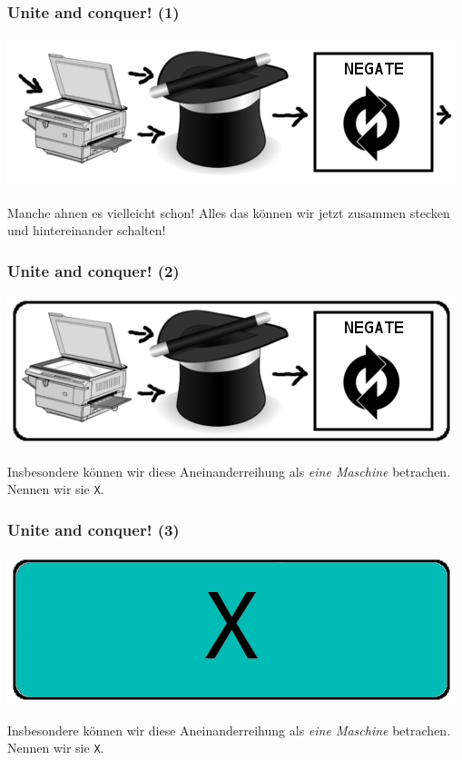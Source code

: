 \documentclass[aspectratio=43]{beamer}
\begin{document}

\begin{frame}
\frametitle{Unite and conquer! (1)}
\begin{center}
\includegraphics[scale=1.4]{images/complete.png} 
\bigskip

Manche ahnen es vielleicht schon! Alles das können wir jetzt zusammen stecken und hintereinander schalten!
\end{center}
\end{frame}


\begin{frame}
\frametitle{Unite and conquer! (2)}
\begin{center}
\includegraphics[scale=1.4]{images/complete_border.png} 
\bigskip

Insbesondere können wir diese Aneinanderreihung als \emph{eine Maschine} betrachen. Nennen wir sie \texttt{X}.
\end{center}
\end{frame}


\begin{frame}
\frametitle{Unite and conquer! (3)}
\begin{center}
\includegraphics[scale=1.4]{images/complete_border_filled.png} 
\bigskip

Insbesondere können wir diese Aneinanderreihung als \emph{eine Maschine} betrachen. Nennen wir sie \texttt{X}.
\end{center}
\end{frame}
\end{document}
